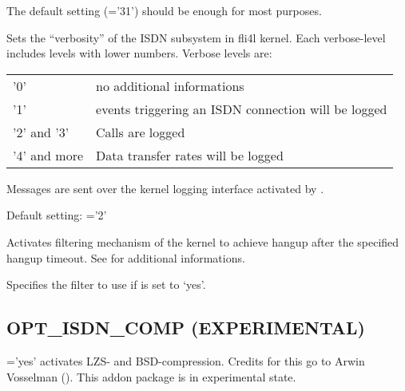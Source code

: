 \begin{description}
  The default setting (='31') should be enough for most purposes.
  
  
  Sets the ``verbosity'' of the ISDN subsystem in fli4l kernel. Each verbose-level 
  includes levels with lower numbers. Verbose levels are:

  \begin{tabular}[h!]{lp{10cm}}
    '0' & no additional informations \\
    '1' & events triggering an ISDN connection will be logged\\
    '2' and '3' & Calls are logged\\
    '4' and more & Data transfer rates will be logged\\
  \end{tabular}

  Messages are sent over the kernel logging interface activated by 
  .

  
  Default setting: ='2'

\begin{sloppypar}

Activates filtering mechanism of the kernel to achieve hangup after the 
specified hangup timeout. See 
for additional informations.
\end{sloppypar}


Specifies the filter to use if  is set to `yes'.

\end{description}


\subsection{OPT\_ISDN\_COMP (EXPERIMENTAL)}

='yes' activates LZS- and BSD-compression. Credits for 
this go to  Arwin Vosselman (). This addon package 
is in experimental state.

